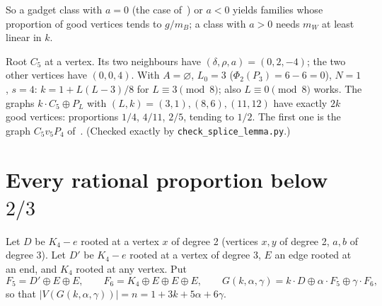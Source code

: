 \documentclass[11pt,a4paper]{report}
\begin{document}
So a gadget class with \(a=0\) (the case of~\autocite{GMD2026}) or \(a<0\) yields families whose proportion of good
vertices tends to \(g/m_B\); a class with \(a>0\) needs \(m_W\) at least linear in \(k\).

\begin{example}[note={\(C_5\), the regime \(a<0\)}]\label{ex:c5}
Root \(C_5\) at a vertex. Its two neighbours have \((\delta,\rho,a)=(0,2,-4)\); the two other vertices have
\((0,0,4)\). With \(A=\varnothing\), \(L_0=3\) (\(\Phi_2(P_3)=6-6=0\)), \(N=1\), \(s=4\): \(k=1+L(L-3)/8\) for
\(L\equiv3\pmod8\); also \(L\equiv0\pmod8\) works. The graphs \(k\cdot C_5\oplus P_L\) with \((L,k)=(3,1),(8,6),(11,12)\)
have exactly \(2k\) good vertices: proportions \(1/4\), \(4/11\), \(2/5\), tending to \(1/2\). The first one is the graph
\(C_5v_5P_4\) of~\autocite{MG2025}. (Checked exactly by \texttt{check\_splice\_lemma.py}.)
\end{example}

\section{Every rational proportion below \texorpdfstring{\(2/3\)}{2/3}}\label{sec:exact}

Let \(D\) be \(K_4-e\) rooted at a vertex \(x\) of degree 2 (vertices \(x,y\) of degree 2, \(a,b\) of degree 3). Let
\(D'\) be \(K_4-e\) rooted at a vertex of degree 3, \(E\) an edge rooted at an end, and \(K_4\) rooted at any vertex. Put
\[F_5=D'\oplus E\oplus E,\qquad F_6=K_4\oplus E\oplus E\oplus E,\qquad
G(k,\alpha,\gamma)=k\cdot D\oplus\alpha\cdot F_5\oplus\gamma\cdot F_6 ,\]
so that \(|V(G(k,\alpha,\gamma))|=n=1+3k+5\alpha+6\gamma\).
\end{document}
